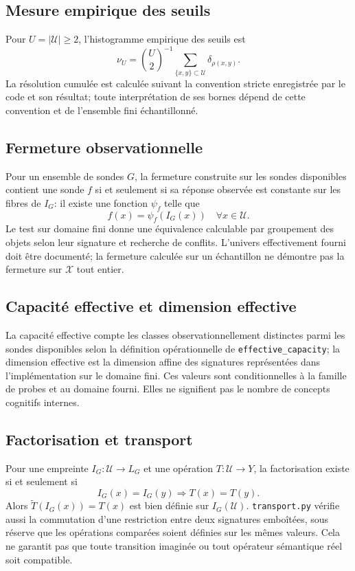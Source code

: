 \documentclass[11pt,a4paper]{article}
\begin{document}
\subsection{Mesure empirique des seuils}
Pour $U=|\mathcal U|\geq2$, l'histogramme empirique des seuils est
\[
\nu_U=\binom U2^{-1}\sum_{\{x,y\}\subset\mathcal U}\delta_{\rho(x,y)}.
\]
La résolution cumulée est calculée suivant la convention stricte enregistrée par le code et son résultat; toute interprétation de ses bornes dépend de cette convention et de l'ensemble fini échantillonné.
\subsection{Fermeture observationnelle}
Pour un ensemble de sondes $G$, la fermeture construite sur les sondes disponibles contient une sonde $f$ si et seulement si sa réponse observée est constante sur les fibres de $I_G$: il existe une fonction $\psi_f$ telle que
\[
f(x)=\psi_f(I_G(x))\quad\forall x\in\mathcal U.
\]
Le test sur domaine fini donne une équivalence calculable par groupement des objets selon leur signature et recherche de conflits. L'univers effectivement fourni doit être documenté; la fermeture calculée sur un échantillon ne démontre pas la fermeture sur $\mathcal X$ tout entier.
\subsection{Capacité effective et dimension effective}
La capacité effective compte les classes observationnellement distinctes parmi les sondes disponibles selon la définition opérationnelle de \texttt{effective\_capacity}; la dimension effective est la dimension affine des signatures représentées dans l'implémentation sur le domaine fini. Ces valeurs sont conditionnelles à la famille de probes et au domaine fourni. Elles ne signifient pas le nombre de concepts cognitifs internes.
\subsection{Factorisation et transport}
Pour une empreinte $I_G:\mathcal U\to L_G$ et une opération $T:\mathcal U\to Y$, la factorisation existe si et seulement si
\[
I_G(x)=I_G(y)\Rightarrow T(x)=T(y).
\]
Alors $\widetilde T(I_G(x))=T(x)$ est bien définie sur $I_G(\mathcal U)$. \texttt{transport.py} vérifie aussi la commutation d'une restriction entre deux signatures emboîtées, sous réserve que les opérations comparées soient définies sur les mêmes valeurs. Cela ne garantit pas que toute transition imaginée ou tout opérateur sémantique réel soit compatible.
\end{document}
